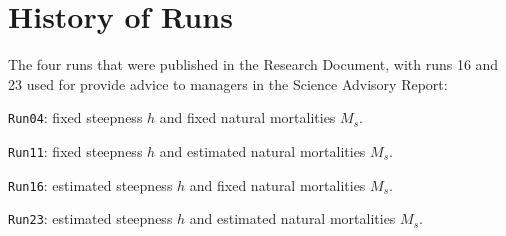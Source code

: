 
\section*{History of Runs}

The four runs that were published in the Research Document, with runs 16 and 23 used for provide advice to managers in the Science Advisory Report:

{\tt Run04}: fixed steepness $h$ and fixed natural mortalities $M_s$. \newline  

{\tt Run11}: fixed steepness $h$ and estimated natural mortalities $M_s$. \newline  

{\tt Run16}: estimated steepness $h$ and fixed natural mortalities $M_s$. \newline  

{\tt Run23}: estimated steepness $h$ and estimated natural mortalities $M_s$. \newline  

